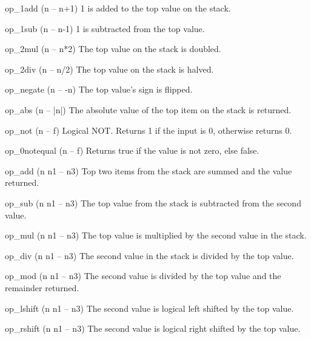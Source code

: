 \documentclass[a4paper, 11pt, openany]{book}
\begin{document}
\begin{forthbox}
  op_1add                (n -- n+1)
                         1 is added to the top value on the stack.

  op_1sub                (n -- n-1)
                         1 is subtracted from the top value.

  op_2mul                (n -- n*2)
                         The top value on the stack is doubled.

  op_2div                (n -- n/2)
                         The top value on the stack is halved.

  op_negate              (n -- -n)
                         The top value's sign is flipped.

  op_abs                 (n -- |n|)
                         The absolute value of the top item on
                         the stack is returned.

  op_not                 (n -- f)
                         Logical NOT. Returns 1 if the input is 0,
                         otherwise returns 0.

  op_0notequal           (n -- f)
                         Returns true if the value is not zero,
                         else false.

  op_add                 (n n1 -- n3)
                         Top two items from the stack are summed
                         and the value returned.

  op_sub                 (n n1 -- n3)
                         The top value from the stack is
                         subtracted from the second value.

  op_mul                 (n n1 -- n3)
                         The top value is multiplied by the
                         second value in the stack.

  op_div                 (n n1 -- n3)
                         The second value in the stack is divided
                         by the top value.

  op_mod                 (n n1 -- n3)
                         The second value is divided by the top
                         value and the remainder returned.

  op_lshift              (n n1 -- n3)
                         The second value is logical left shifted
                         by the top value.

  op_rshift              (n n1 -- n3)
                         The second value is logical right shifted
                         by the top value.


\end{forthbox}
\end{document}
